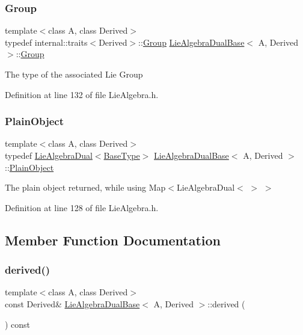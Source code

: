 \subsubsection{\texorpdfstring{Group}{Group}}
{\footnotesize\ttfamily template$<$class A, class Derived$>$ \\
typedef internal\+::traits$<$Derived$>$\+::\hyperlink{class_lie_algebra_dual_base_a540618e11addb56f20f6d007204c107c}{Group} \hyperlink{class_lie_algebra_dual_base}{Lie\+Algebra\+Dual\+Base}$<$ A, Derived $>$\+::\hyperlink{class_lie_algebra_dual_base_a540618e11addb56f20f6d007204c107c}{Group}}

The type of the associated Lie Group 

Definition at line 132 of file Lie\+Algebra.\+h.

\hypertarget{class_lie_algebra_dual_base_a9b59cead2f78ed837cd22a96155e5da3}{}\label{class_lie_algebra_dual_base_a9b59cead2f78ed837cd22a96155e5da3} 
\subsubsection{\texorpdfstring{Plain\+Object}{PlainObject}}
{\footnotesize\ttfamily template$<$class A, class Derived$>$ \\
typedef \hyperlink{class_lie_algebra_dual}{Lie\+Algebra\+Dual}$<$\hyperlink{class_lie_algebra_dual_base_a1d0d10f7479bc0e235b13e29f1c012d2}{Base\+Type}$>$ \hyperlink{class_lie_algebra_dual_base}{Lie\+Algebra\+Dual\+Base}$<$ A, Derived $>$\+::\hyperlink{class_lie_algebra_dual_base_a9b59cead2f78ed837cd22a96155e5da3}{Plain\+Object}}

The plain object returned, while using Map$<$Lie\+Algebra\+Dual$<$ $>$ $>$ 

Definition at line 128 of file Lie\+Algebra.\+h.



\subsection{Member Function Documentation}
\hypertarget{class_lie_algebra_dual_base_a7d3f98b2b7516cbd7d86d756de8fa486}{}\label{class_lie_algebra_dual_base_a7d3f98b2b7516cbd7d86d756de8fa486} 
\subsubsection{\texorpdfstring{derived()}{derived()}\hspace{0.1cm}{\footnotesize\ttfamily [1/2]}}
{\footnotesize\ttfamily template$<$class A, class Derived$>$ \\
const Derived\& \hyperlink{class_lie_algebra_dual_base}{Lie\+Algebra\+Dual\+Base}$<$ A, Derived $>$\+::derived (\begin{DoxyParamCaption}{ }\end{DoxyParamCaption}) const\hspace{0.3cm}{\ttfamily [inline]}}

